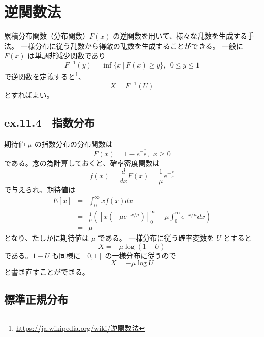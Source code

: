 \documentclass[10pt, a4paper]{ltjsarticle}
\begin{document}
\section{逆関数法}


累積分布関数（分布関数）$F(x)$ の逆関数を用いて、様々な乱数を生成する手法。
一様分布に従う乱数から得敵の乱数を生成することができる。
一般に $F(x)$ は単調非減少関数であり
\begin{equation}
  F^{-1}(y) = \inf\{x~|~F(x) \geq y \}, ~~0\leq y\leq 1
\end{equation}
で逆関数を定義すると\footnote{\url{https://ja.wikipedia.org/wiki/逆関数法}}、
\begin{equation}
  X = F^{-1}(U)
\end{equation}
とすればよい。

\subsection{ex.11.4　指数分布}

期待値 $\mu$ の指数分布の分布関数は
\begin{equation}
  F(x) = 1 - e^{-\frac{x}{\mu}},~~x\geq 0
\end{equation}
である。念の為計算しておくと、確率密度関数は
\begin{equation}
  f(x) = \frac{d}{dx}F(x) = \frac{1}{\mu}e^{-\frac{x}{\mu}}
\end{equation}
で与えられ、期待値は
\begin{eqnarray}
  E[x] &=& \int_{0}^{\infty} xf(x)dx \\
  &=& \frac{1}{\mu} \left( \left[x(-\mu e^{-x/\mu})\right]_0^\infty + \mu \int_0^{\infty} e^{-x/\mu} dx \right) \\
  &=& \mu
\end{eqnarray}
となり、たしかに期待値は $\mu$ である。
一様分布に従う確率変数を $U$ とすると
\begin{equation}
  X = - \mu \log(1-U) 
\end{equation}
である。$1-U$ も同様に $[0,1]$ の一様分布に従うので
\begin{equation}
  X = -\mu \log U
\end{equation}
と書き直すことができる。


\subsection{標準正規分布}
\end{document}
